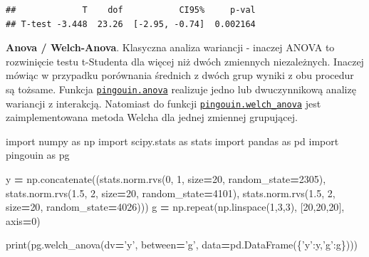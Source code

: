\documentclass[polish,]{book}
\newenvironment{Shaded}{\begin{snugshade}}{\end{snugshade}}
\newcommand{\BuiltInTok}[1]{#1}
\newcommand{\DecValTok}[1]{\textcolor[rgb]{0.00,0.00,0.81}{#1}}
\newcommand{\FloatTok}[1]{\textcolor[rgb]{0.00,0.00,0.81}{#1}}
\newcommand{\ImportTok}[1]{#1}
\newcommand{\NormalTok}[1]{#1}
\newcommand{\OperatorTok}[1]{\textcolor[rgb]{0.81,0.36,0.00}{\textbf{#1}}}
\newcommand{\StringTok}[1]{\textcolor[rgb]{0.31,0.60,0.02}{#1}}
\begin{document}
\begin{verbatim}
##             T    dof           CI95%     p-val
## T-test -3.448  23.26  [-2.95, -0.74]  0.002164
\end{verbatim}

\textbf{Anova / Welch-Anova}. Klasyczna analiza wariancji - inaczej ANOVA to rozwinięcie testu t-Studenta dla więcej niż dwóch zmiennych niezależnych. Inaczej mówiąc w przypadku porównania średnich z dwóch grup wyniki z obu procedur są tożsame. Funkcja \href{https://pingouin-stats.org/generated/pingouin.anova.html\#pingouin.anova}{\texttt{pingouin.anova}} realizuje jedno lub dwuczynnikową analizę wariancji z interakcją. Natomiast do funkcji \href{https://pingouin-stats.org/generated/pingouin.welch_anova.html\#pingouin.welch_anova}{\texttt{pingouin.welch\_anova}} jest zaimplementowana metoda Welcha dla jednej zmiennej grupującej.

\begin{Shaded}
\begin{Highlighting}[]
\ImportTok{import}\NormalTok{ numpy }\ImportTok{as}\NormalTok{ np}
\ImportTok{import}\NormalTok{ scipy.stats }\ImportTok{as}\NormalTok{ stats}
\ImportTok{import}\NormalTok{ pandas }\ImportTok{as}\NormalTok{ pd}
\ImportTok{import}\NormalTok{ pingouin }\ImportTok{as}\NormalTok{ pg}

\NormalTok{y }\OperatorTok{=}\NormalTok{ np.concatenate((stats.norm.rvs(}\DecValTok{0}\NormalTok{, }\DecValTok{1}\NormalTok{, size}\OperatorTok{=}\DecValTok{20}\NormalTok{, random_state}\OperatorTok{=}\DecValTok{2305}\NormalTok{),}
\NormalTok{                    stats.norm.rvs(}\FloatTok{1.5}\NormalTok{, }\DecValTok{2}\NormalTok{, size}\OperatorTok{=}\DecValTok{20}\NormalTok{, random_state}\OperatorTok{=}\DecValTok{4101}\NormalTok{),}
\NormalTok{                    stats.norm.rvs(}\FloatTok{1.5}\NormalTok{, }\DecValTok{2}\NormalTok{, size}\OperatorTok{=}\DecValTok{20}\NormalTok{, random_state}\OperatorTok{=}\DecValTok{4026}\NormalTok{)))}
\NormalTok{g }\OperatorTok{=}\NormalTok{ np.repeat(np.linspace(}\DecValTok{1}\NormalTok{,}\DecValTok{3}\NormalTok{,}\DecValTok{3}\NormalTok{), [}\DecValTok{20}\NormalTok{,}\DecValTok{20}\NormalTok{,}\DecValTok{20}\NormalTok{], axis}\OperatorTok{=}\DecValTok{0}\NormalTok{)}

\BuiltInTok{print}\NormalTok{(pg.welch_anova(dv}\OperatorTok{=}\StringTok{'y'}\NormalTok{, between}\OperatorTok{=}\StringTok{'g'}\NormalTok{, data}\OperatorTok{=}\NormalTok{pd.DataFrame(\{}\StringTok{'y'}\NormalTok{:y,}\StringTok{'g'}\NormalTok{:g\})))}
\end{Highlighting}
\end{Shaded}
\end{document}
